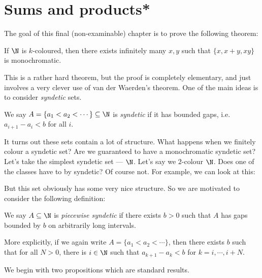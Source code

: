 \documentclass[a4paper]{article}
\begin{document}
\section{Sums and products*}
The goal of this final (non-examinable) chapter is to prove the following theorem:
\begin{thm}[Moreira, 2016]
  If $\N$ is $k$-coloured, then there exists infinitely many $x, y$ such that $\{x, x + y, xy\}$ is monochromatic.
\end{thm}
This is a rather hard theorem, but the proof is completely elementary, and just involves a very clever use of van der Waerden's theorem. One of the main ideas is to consider \emph{syndetic} sets.
\begin{defi}
  We say $A = \{a_1 < a_2 < \cdots\} \subseteq \N$ is \emph{syndetic} if it has bounded gaps, i.e.\ $a_{i + 1} - a_i < b$ for all $i$.
\end{defi}

It turns out these sets contain a lot of structure. What happens when we finitely colour a syndetic set? Are we guaranteed to have a monochromatic syndetic set? Let's take the simplest syndetic set --- $\N$. Let's say we $2$-colour $\N$. Does one of the classes have to by syndetic? Of course not. For example, we can look at this:
\begin{center}
\end{center}
But this set obviously has some very nice structure. So we are motivated to consider the following definition:
\begin{defi}
  We say $A \subseteq \N$ is \emph{piecewise syndetic} if there exists $b > 0$ such that $A$ has gaps bounded by $b$ on arbitrarily long intervals.

  More explicitly, if we again write $A = \{a_1 < a_2 < \cdots\}$, then there exists $b$ such that for all $N > 0$, there is $i \in \N$ such that $a_{k + 1} - a_k < b$ for $k = i, \cdots, i + N$.
\end{defi}
We begin with two propositions which are standard results.
\end{document}
